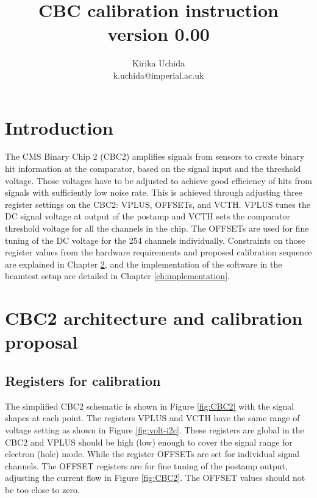 \documentclass[11pt,a4paper]{article}
\begin{document}
\title{CBC calibration instruction \\ version 0.00}

\author{Kirika Uchida\\
	k.uchida@imperial.ac.uk}

	\maketitle
	\tableofcontents
	\listoffigures %
	\listoftables  %

	\section{Introduction}
	The CMS Binary Chip 2 (CBC2) amplifies signals from sensors to create binary hit information at the comparator, 
	based on the signal input and the threshold voltage. 
	Those voltages have to be adjusted to achieve good efficiency of hits from signals with sufficiently low noise rate. 
	This is achieved through adjusting three register settings on the CBC2: VPLUS, OFFSETs, and VCTH.  
	VPLUS tunes the DC signal voltage at output of the postamp and VCTH sets the comparator threshold voltage for all the channels in the chip.  
	The OFFSETs are used for fine tuning of the DC voltage for the 254 channels individually. 
	Constraints on those register values from the hardware requirements and 
	proposed calibration sequence are explained in Chapter \ref{ch:architecture-proposal}, 
	and the implementation of the software in the beamtest setup are detailed in Chapter \ref{ch:implementation}.  

	\section{CBC2 architecture and calibration proposal}\label{ch:architecture-proposal}
	\subsection{Registers for calibration}\label{sec:reg}
	The simplified CBC2 schematic is shown in Figure \ref{fig:CBC2} with the signal shapes at each point.  
	The registers VPLUS and VCTH have the same range of voltage setting as shown in Figure \ref{fig:volt-i2c}. 
	These registers are global in the CBC2 and VPLUS should be high (low) enough to cover the signal range for electron (hole) mode.
	While the register OFFSETs are set for individual signal channels. 
	The OFFSET registers are for fine tuning of the postamp output, adjusting the current flow in Figure \ref{fig:CBC2}. The OFFSET values should not be too close to zero. 
\end{document}
